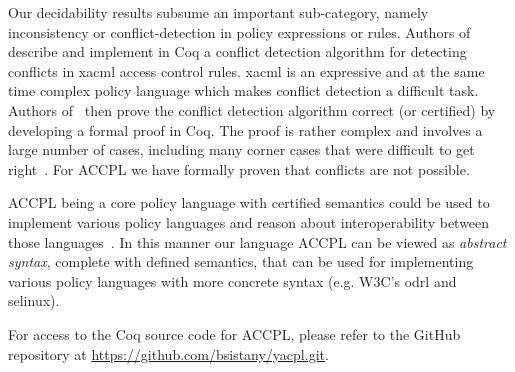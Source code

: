 Our decidability results subsume an important sub-category, namely inconsistency or conflict-detection in policy expressions or rules. Authors of~\cite{st2012verified}~\cite{felty13} describe and implement in Coq a conflict detection algorithm for detecting conflicts in \ac{xacml} access control rules. \ac{xacml} is an expressive and at the same time complex policy language which makes conflict detection a difficult task. Authors of~\cite{st2012verified} then prove the conflict detection algorithm correct (or certified) by developing a formal proof in Coq. The proof is rather complex and involves a large number of cases, including many corner cases that were difficult to get right~\cite{st2012verified}. For \ac{ACCPL} we have formally proven that conflicts are not possible.

\ac{ACCPL} being a core policy language with certified semantics could be used to implement various policy languages and reason about interoperability between those languages~\cite{prados2005interoperability, maronas2009architecture}. In this manner our language \ac{ACCPL} can be viewed as \emph{abstract syntax}, complete with defined semantics, that can be used for implementing various policy languages with more concrete syntax (e.g. W3C's \ac{odrl} and \ac{selinux}). 

For access to the Coq source code for \ac{ACCPL}, please refer to the GitHub repository at \url{https://github.com/bsistany/yacpl.git}.













